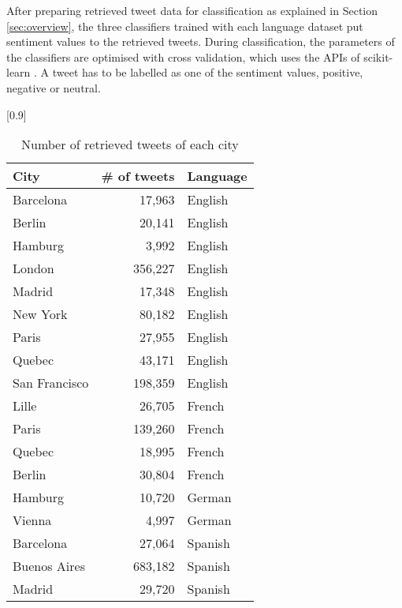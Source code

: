 \documentclass[twocolumn]{article}
\begin{document}
After preparing retrieved tweet data for classification as explained in Section \ref{sec:overview}, the three classifiers trained with each language dataset put sentiment values to the retrieved tweets.
During classification, the parameters of the classifiers are optimised with cross validation, which uses the APIs of scikit-learn \cite{scikit}.
A tweet has to be labelled as one of the sentiment values, positive, negative or neutral.

\begin{table}[ht]
	\caption{Number of retrieved tweets of each city}
	\scalebox{1.0}[0.9]{
	\begin{tabular}{|l|r|l|} \hline
	City&\# of tweets&Language\\ \hline \hline
	Barcelona & 17,963 & English \\ \hline
	Berlin & 20,141 & English\\ \hline
	Hamburg & 3,992 & English\\ \hline
	London  & 356,227& English\\ \hline
	Madrid & 17,348 & English \\ \hline
	New York  & 80,182  & English\\ \hline
	Paris & 27,955 & English \\ \hline
	Quebec & 43,171 & English \\ \hline
	San Francisco & 198,359  & English\\ \hline
	Lille & 26,705  & French\\ \hline
	Paris & 139,260 & French\\ \hline
	Quebec & 18,995 & French\\ \hline
	Berlin & 30,804 & French\\ \hline
	Hamburg & 10,720 & German\\ \hline
	Vienna & 4,997  & German\\ \hline
	Barcelona&27,064 & Spanish\\ \hline
	Buenos Aires&683,182  & Spanish\\ \hline
	Madrid& 29,720 & Spanish\\ \hline
	\end{tabular}
	}
	\label{tab:cities}
\end{table}

\vspace{-6mm}
\end{document}
